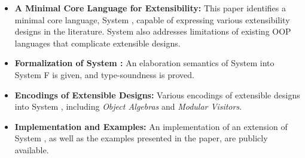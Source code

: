 \begin{itemize}

\item {\bf A Minimal Core Language for Extensibility:} This paper
  identifies a minimal core language, System \name, capable of
  expressing various extensibility designs in the literature.
  System \name also addresses limitations of existing OOP
  languages that complicate extensible designs. 
  
\item {\bf Formalization of System \name:} An elaboration semantics of
  System \name into System F is given, and type-soundness is proved.

\item {\bf Encodings of Extensible Designs:} Various encodings of
  extensible designs into System \name, including \emph{Object
    Algebras} and \emph{Modular Visitors}. 

\item {\bf Implementation and Examples:} An implementation of an
  extension of System \name, as well as the examples presented in the
  paper, are publicly available. 

\begin{comment}

\item{elaboration typing rules which given a source expression with intersection
    types, typecheck and translate it into an ordinary F term. Prove a type
    preservation result: if a term $ e $ has type $ \tau $ in the source language,
    then the translated term $ \image e $ is well-typed and has type $ \image \tau $ in the
    target language.}

\item{present an algorithm for detecting incoherence which can be very important
    in practice.}

\item{explores the connection between intersection types and object algebra by
    showing various examples of encoding object algebra with intersection
    types.}

\end{comment}

\end{itemize}

\begin{comment}
\subsection{Other Notes}

finitary overloading: yes
but have other merits of intersection been explored?

-- Compare Scala:
-- merge[A,B] = new A with B

-- type IEval  = { eval :  Int }
-- type IPrint = { print : String }

-- F[\_]
\end{comment}